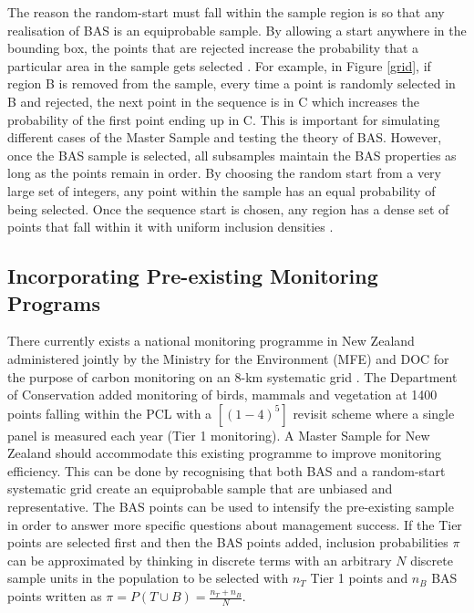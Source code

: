 \documentclass[]{article}
\begin{document}
The reason the random-start must fall within the sample region is so that any realisation of BAS is an equiprobable sample. By allowing a start anywhere in the bounding box, the points that are rejected increase the probability that a particular area in the sample gets selected \cite{Robertson2016}. For example, in Figure \ref{grid}, if region B is removed from the sample, every time a point is randomly selected in B and rejected, the next point in the sequence is in C which increases the probability of the first point ending up in C. This is important for simulating different cases of the Master Sample and testing the theory of BAS. However, once the BAS sample is selected, all subsamples maintain the BAS properties as long as the points remain in order. By choosing the random start from a very large set of integers, any point within the sample has an equal probability of being selected. Once the sequence start is chosen, any region has a dense set of points that fall within it with uniform inclusion densities \cite{Robertson2013}.\\

\subsection{Incorporating Pre-existing Monitoring Programs}
There currently exists a national monitoring programme in New Zealand administered jointly by the Ministry for the Environment (MFE) and DOC for the purpose of carbon monitoring on an 8-km systematic grid \cite{Coomes2002}. The Department of Conservation added monitoring of birds, mammals and vegetation at 1400 points falling within the PCL with a $[(1-4)^5]$ revisit scheme where a single panel is measured each year (Tier 1 monitoring). A Master Sample for New Zealand should accommodate this existing programme to improve monitoring efficiency. This can be done by recognising that both BAS and a random-start systematic grid create an equiprobable sample that are unbiased and representative. The BAS points can be used to intensify the pre-existing sample in order to answer more specific questions about management success. If the Tier points are selected first and then the BAS points added, inclusion probabilities $\pi$ can be approximated by thinking in discrete terms with an arbitrary $N$ discrete sample units in the population to be selected with $n_T$ Tier 1 points and $n_B$ BAS points written as $\pi = P(T \cup B) = \frac{n_T + n_B}{N}$.\\
\end{document}
